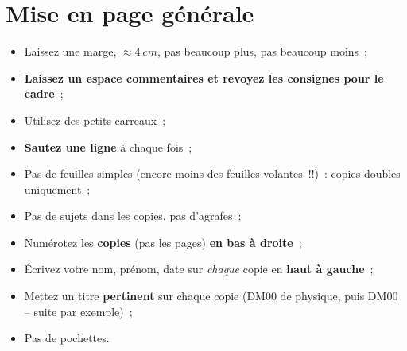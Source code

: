 \documentclass[a4paper, 11pt, final, garamond]{book}
\begin{document}
\section{Mise en page générale}
\begin{itemize}
	\item{}%
	      {\Large Laissez une marge, $\approx \SI{4}{cm}$, pas beaucoup plus,
	            pas beaucoup moins~;}
	\item \textbf{Laissez un espace commentaires et revoyez les consignes pour le
		      cadre}~;
	\item Utilisez des petits carreaux~;
	\item \textbf{Sautez une ligne} à chaque fois~;
	\item Pas de feuilles simples (encore moins des feuilles volantes~!!)~: copies
	      doubles uniquement~;
	\item Pas de sujets dans les copies, pas d'agrafes~;
	\item Numérotez les \textbf{copies} (pas les pages) \textbf{en bas à droite}~;
	\item Écrivez votre nom, prénom, date sur \textit{chaque} copie en
	      \textbf{haut à gauche}~;
	\item Mettez un titre \textbf{pertinent} sur chaque copie (DM00 de physique,
	      puis DM00 – suite par exemple)~;
	\item Pas de pochettes.
\end{itemize}
\end{document}
